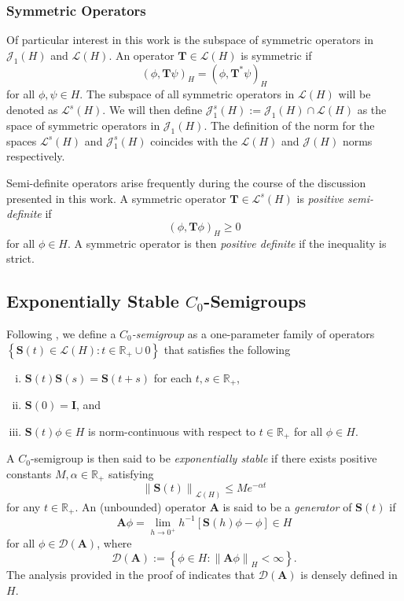 \documentclass{amsart}
\newcommand{\sL}{\mathscr L}
\newcommand{\sJ}{\mathscr J}
\newcommand{\p}[1]{\left( {#1} \right)}
\newcommand{\norm}[1]{\left\| #1 \right\|}
\newcommand{\br}[1]{\left[ #1 \right]}
\newcommand{\Br}[1]{\left\{ #1 \right\}}
\newcommand{\bA}{\mathbf A}
\newcommand{\bS}{\mathbf S}
\newcommand{\bT}{\mathbf T}
\begin{document}
\subsubsection{Symmetric Operators}
Of particular interest in this work is the subspace of symmetric operators in $\sJ_1\p{H}$ and $\sL\p{H}$. An operator $\bT\in\sL\p{H}$ is symmetric if
$$
    \p{\phi, \bT \psi}_H = \p{\phi, \bT^* \psi}_H
$$
for all $\phi, \psi \in H$. The subspace of all symmetric operators in $\sL\p{H}$ will be denoted as $\sL^s\p{H}$. We will then define $\sJ_1^s(H):=\sJ_1(H)\cap\sL(H)$ as the space of symmetric operators in $\sJ_1(H)$. The definition of the norm for the spaces $\sL^s(H)$ and $\sJ_1^s(H)$ coincides with the $\sL(H)$ and $\sJ(H)$ norms respectively. 

Semi-definite operators arise frequently during the course of the discussion presented in this work. A symmetric operator $\bT \in \sL^s(H)$ is \emph{positive semi-definite} if
$$
    \p{\phi, \bT \phi}_H \geq 0
$$
for all $\phi \in H$. A symmetric operator is then \emph{positive definite} if the inequality is strict. 

\subsection{Exponentially Stable $C_0$-Semigroups}

Following \cite[\S 2]{goldstein2017semigroups}, we define a \emph{$C_0$-semigroup} as a one-parameter family of operators $\Br{\bS(t) \in \sL(H): t \in \mathbb R_+\cup{0}}$ that satisfies the following
\begin{enumerate}[i)]
    \item $\bS(t)\bS(s) = \bS(t+s)$ for each $t,s \in \mathbb R_+$,
    \item $\bS(0) = \mathbf I$, and
    \item $\bS(t)\phi \in H$ is norm-continuous with respect to $t\in\mathbb R_+$ for all $\phi \in H$.
\end{enumerate}
A $C_0$-semigroup is then said to be \emph{exponentially stable} if there exists positive constants $M,\alpha \in \mathbb R_+$ satisfying
\begin{equation} \label{eqn: exponential stability bound}
    \norm{\bS(t)}_{\sL(H)} \leq Me^{-\alpha t}
\end{equation}
for any $t \in \mathbb R_+$. An (unbounded) operator $\bA$ is said to be a \emph{generator} of $\bS(t)$ if 
\begin{equation} \label{eqn: A definition}
\bA\phi = \lim_{h\rightarrow 0^+} h^{-1}\br{\bS(h)\phi - \phi} \in H
\end{equation}
for all $\phi \in \mathcal D(\bA)$, where
$$
    \mathcal D(\bA):=\Br{\phi \in H: \norm{\bA\phi}_H < \infty}. 
$$
The analysis provided in the proof of \cite[Theorem 2.6]{goldstein2017semigroups} indicates that $\mathcal D(\bA)$ is densely defined in $H$. 
\end{document}
